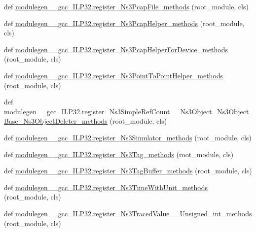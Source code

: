 \begin{DoxyCompactItemize}
\item 
def \hyperlink{namespacemodulegen____gcc__ILP32_a6f9559ad329fc07d113c60175da4c407}{modulegen\+\_\+\+\_\+gcc\+\_\+\+I\+L\+P32.\+register\+\_\+\+Ns3\+Pcap\+File\+\_\+methods} (root\+\_\+module, cls)
\item 
def \hyperlink{namespacemodulegen____gcc__ILP32_ad23ad74660470f64681b3cc1718dcff6}{modulegen\+\_\+\+\_\+gcc\+\_\+\+I\+L\+P32.\+register\+\_\+\+Ns3\+Pcap\+Helper\+\_\+methods} (root\+\_\+module, cls)
\item 
def \hyperlink{namespacemodulegen____gcc__ILP32_ab4a403fafcdf0b5d47126dcf02ee269f}{modulegen\+\_\+\+\_\+gcc\+\_\+\+I\+L\+P32.\+register\+\_\+\+Ns3\+Pcap\+Helper\+For\+Device\+\_\+methods} (root\+\_\+module, cls)
\item 
def \hyperlink{namespacemodulegen____gcc__ILP32_af2fa1f5497b89be2c0cf4ff70b84e56a}{modulegen\+\_\+\+\_\+gcc\+\_\+\+I\+L\+P32.\+register\+\_\+\+Ns3\+Point\+To\+Point\+Helper\+\_\+methods} (root\+\_\+module, cls)
\item 
def \hyperlink{namespacemodulegen____gcc__ILP32_ac5f5e4798fdbd14c15d133fdd259a2e0}{modulegen\+\_\+\+\_\+gcc\+\_\+\+I\+L\+P32.\+register\+\_\+\+Ns3\+Simple\+Ref\+Count\+\_\+\+\_\+\+Ns3\+Object\+\_\+\+Ns3\+Object\+Base\+\_\+\+Ns3\+Object\+Deleter\+\_\+methods} (root\+\_\+module, cls)
\item 
def \hyperlink{namespacemodulegen____gcc__ILP32_aa549fc85b0feec2f8115e70db4c26c2a}{modulegen\+\_\+\+\_\+gcc\+\_\+\+I\+L\+P32.\+register\+\_\+\+Ns3\+Simulator\+\_\+methods} (root\+\_\+module, cls)
\item 
def \hyperlink{namespacemodulegen____gcc__ILP32_a5578ddbed750d0c575df9ed36c4d86d6}{modulegen\+\_\+\+\_\+gcc\+\_\+\+I\+L\+P32.\+register\+\_\+\+Ns3\+Tag\+\_\+methods} (root\+\_\+module, cls)
\item 
def \hyperlink{namespacemodulegen____gcc__ILP32_a24ac4bbf908e2dfdea2eca022c057906}{modulegen\+\_\+\+\_\+gcc\+\_\+\+I\+L\+P32.\+register\+\_\+\+Ns3\+Tag\+Buffer\+\_\+methods} (root\+\_\+module, cls)
\item 
def \hyperlink{namespacemodulegen____gcc__ILP32_a8942fb893268c4774333e3a81c3cf7d3}{modulegen\+\_\+\+\_\+gcc\+\_\+\+I\+L\+P32.\+register\+\_\+\+Ns3\+Time\+With\+Unit\+\_\+methods} (root\+\_\+module, cls)
\item 
def \hyperlink{namespacemodulegen____gcc__ILP32_ab83b32b8387dfc69dc0c01e4c77b063d}{modulegen\+\_\+\+\_\+gcc\+\_\+\+I\+L\+P32.\+register\+\_\+\+Ns3\+Traced\+Value\+\_\+\+\_\+\+Unsigned\+\_\+int\+\_\+methods} (root\+\_\+module, cls)
\item 

\end{DoxyCompactItemize}
